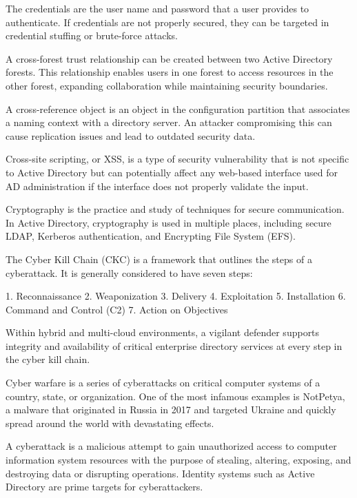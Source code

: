 The credentials are the user name and password that a user provides to authenticate. If credentials are not properly secured, they can be targeted in credential stuffing or brute-force attacks.

 A cross-forest trust relationship can be created between two Active Directory forests. This relationship enables users in one forest to access resources in the other forest, expanding collaboration while maintaining security boundaries.

 A cross-reference object is an object in the configuration partition that associates a naming context with a directory server. An attacker compromising this can cause replication issues and lead to outdated security data.

 Cross-site scripting, or XSS, is a type of security vulnerability that is not specific to Active Directory but can potentially affect any web-based interface used for AD administration if the interface does not properly validate the input.

 Cryptography is the practice and study of techniques for secure communication. In Active Directory, cryptography is used in multiple places, including secure LDAP, Kerberos authentication, and Encrypting File System (EFS).

 The Cyber Kill Chain (CKC) is a framework that outlines the steps of a cyberattack. It is generally considered to have seven steps:

1. Reconnaissance
2. Weaponization
3. Delivery
4. Exploitation
5. Installation
6. Command and Control (C2)
7. Action on Objectives

Within hybrid and multi-cloud environments, a vigilant defender supports integrity and availability of critical enterprise directory services at every step in the cyber kill chain.

 Cyber warfare is a series of cyberattacks on critical computer systems of a country, state, or organization. One of the most infamous examples is NotPetya, a malware that originated in Russia in 2017 and targeted Ukraine and quickly spread around the world with devastating effects.

 A cyberattack is a malicious attempt to gain unauthorized access to computer information system resources with the purpose of stealing, altering, exposing, and destroying data or disrupting operations. Identity systems such as Active Directory are prime targets for cyberattackers.

